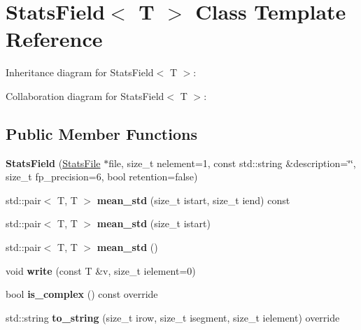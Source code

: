 \hypertarget{classStatsField}{}\section{Stats\+Field$<$ T $>$ Class Template Reference}
\label{classStatsField}


Inheritance diagram for Stats\+Field$<$ T $>$\+:


Collaboration diagram for Stats\+Field$<$ T $>$\+:
\subsection*{Public Member Functions}
\begin{DoxyCompactItemize}
\item 
{\bfseries Stats\+Field} (\hyperlink{classStatsFile}{Stats\+File} $\ast$file, size\+\_\+t nelement=1, const std\+::string \&description=\char`\"{}\char`\"{}, size\+\_\+t fp\+\_\+precision=6, bool retention=false)\hypertarget{classStatsField_a93e5b0b232dc5f159b997a2e4ed88fff}{}\label{classStatsField_a93e5b0b232dc5f159b997a2e4ed88fff}

\item 
std\+::pair$<$ T, T $>$ {\bfseries mean\+\_\+std} (size\+\_\+t istart, size\+\_\+t iend) const \hypertarget{classStatsField_a2f7d28bb0e3097b372a3d5229e591e1a}{}\label{classStatsField_a2f7d28bb0e3097b372a3d5229e591e1a}

\item 
std\+::pair$<$ T, T $>$ {\bfseries mean\+\_\+std} (size\+\_\+t istart)\hypertarget{classStatsField_aed72e0d4a119084e39290d63b20e42f3}{}\label{classStatsField_aed72e0d4a119084e39290d63b20e42f3}

\item 
std\+::pair$<$ T, T $>$ {\bfseries mean\+\_\+std} ()\hypertarget{classStatsField_a0ec061f1d2e7daeca2236da89f5eb63c}{}\label{classStatsField_a0ec061f1d2e7daeca2236da89f5eb63c}

\item 
void {\bfseries write} (const T \&v, size\+\_\+t ielement=0)\hypertarget{classStatsField_af78ffa365d95e33f01c7ded2b7880ae7}{}\label{classStatsField_af78ffa365d95e33f01c7ded2b7880ae7}

\item 
bool {\bfseries is\+\_\+complex} () const override\hypertarget{classStatsField_a557ddd81601f7f4f54f20b09221aa2f3}{}\label{classStatsField_a557ddd81601f7f4f54f20b09221aa2f3}

\item 
std\+::string {\bfseries to\+\_\+string} (size\+\_\+t irow, size\+\_\+t isegment, size\+\_\+t ielement) override\hypertarget{classStatsField_a1a96fc4590d08e30f6af400394cc2a5f}{}\label{classStatsField_a1a96fc4590d08e30f6af400394cc2a5f}

\end{DoxyCompactItemize}
